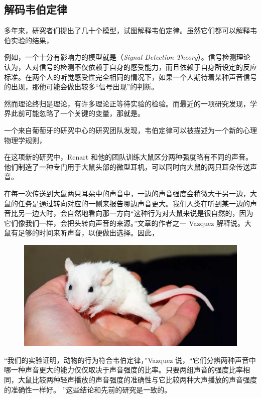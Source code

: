\begin{multicols}{2}
\section*{解码韦伯定律}

多年来，研究者们提出了几十个模型，试图解释韦伯定律。虽然它们都可以解释韦伯实验的结果，

例如，一个十分有影响力的模型就是（\textit{Signal Detection Theory}）。信号检测理论认为，人对信号的检测不仅依赖于自身的感受能力，而且依赖于自身所设定的反应标准。在两个人的听觉感受性完全相同的情况下，如果一个人期待着某种声音信号的出现，那他可能会做出较多“信号出现”的判断。

然而理论终归是理论，有许多理论正等待实验的检验。而最近的一项研究发现，学界此前可能忽略了一个关键的变量，那就是。

一个来自葡萄牙的研究中心的研究团队发现，韦伯定律可以被描述为一个新的心理物理学规则，

在这项新的研究中，Renart 和他的团队训练大鼠区分两种强度略有不同的声音。他们制造了一种专门用于大鼠头部的微型耳机，可以同时向大鼠的两只耳朵传送声音。

在每一次传送到大鼠两只耳朵中的声音中，一边的声音强度会稍微大于另一边，大鼠的任务是通过转向对应的一侧来报告哪边声音更大。我们人类在听到某一边的声音比另一边大时，会自然地看向那一方向“这种行为对大鼠来说是很自然的，因为它们像我们一样，会把头转向声音的来源。”文章的作者之一 Vazquez 解释说。大鼠有足够的时间来听声音，以便做出选择。因此，
\begin{figure}[H]
\centering
\includegraphics[width=\linewidth]{IMG/201909/190903}
\end{figure}

“我们的实验证明，动物的行为符合韦伯定律，”Vazquez 说，“它们分辨两种声音中哪一种声音更大的能力仅仅取决于声音强度的比率。只要两组声音的强度比率相同，大鼠比较两种轻声播放的声音强度的准确性与它比较两种大声播放的声音强度的准确性一样好。 ”这些结论和先前的研究是一致的。


\end{multicols}
